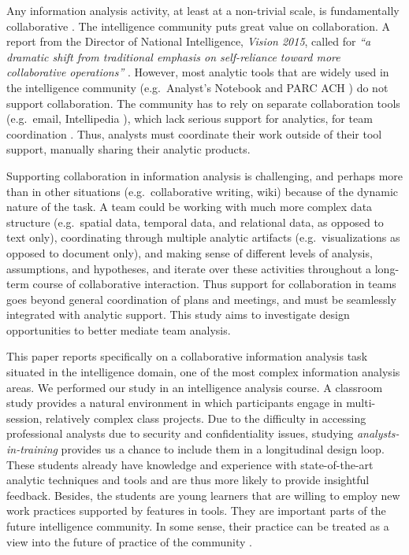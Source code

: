 Any information analysis activity, at least at a non-trivial scale, is
fundamentally collaborative \cite{Convertino2011}. The intelligence community
puts great value on collaboration. A report from the Director of National
Intelligence, \emph{Vision 2015},  called for \emph{``a dramatic shift from
traditional emphasis on self-reliance toward more collaborative operations''}
\cite[p.13]{Vision2015}. However, most analytic tools that are widely used in
the intelligence community (e.g.~Analyst's Notebook \cite{IBM} and PARC ACH
\cite{PARC}) do not support collaboration. The community has to rely on separate
collaboration tools (e.g.~email, Intellipedia \cite{Intelink2017}), which lack
serious support for analytics, for team coordination \cite{Treverton2016}. Thus,
analysts must coordinate their work outside of their tool support, manually
sharing their analytic products.

Supporting collaboration in information analysis is challenging, and perhaps
more than in other situations (e.g.~collaborative writing, wiki) because of the
dynamic nature of the task. A team could be working with much more complex data
structure (e.g.~spatial data, temporal data, and relational data, as opposed to
text only), coordinating through multiple analytic artifacts
(e.g.~visualizations as opposed to document only), and making sense of different
levels of analysis, assumptions, and hypotheses, and iterate over these
activities throughout a long-term course of collaborative interaction. Thus
support for collaboration in teams goes beyond general coordination of plans and
meetings, and must be seamlessly integrated with analytic support. This study
aims to investigate design opportunities to better mediate team analysis.

This paper reports specifically on a collaborative information analysis task
situated in the intelligence domain, one of the most complex information
analysis areas. We performed our study in an intelligence analysis course. A
classroom study provides a natural environment in which participants engage in
multi-session, relatively complex class projects. Due to the difficulty in
accessing professional analysts due to security and confidentiality issues,
studying \emph{analysts-in-training} provides us a chance to include them in a
longitudinal design loop. These students already have knowledge and experience
with state-of-the-art analytic techniques and tools and are thus more likely to
provide insightful feedback. Besides, the students are young learners that are
willing to employ new work practices supported by features in tools. They are
important parts of the future intelligence community. In some sense, their
practice can be treated as a view into the future of practice of the community
\cite{Martin2014}.

